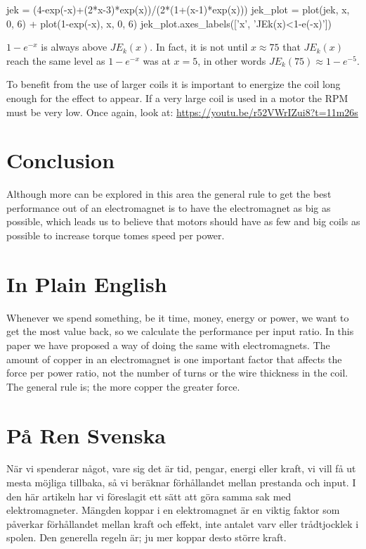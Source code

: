 \documentclass[]{../common/elementary-physics}
\begin{document}
\begin{sagesilent}
jek = (4-exp(-x)+(2*x-3)*exp(x))/(2*(1+(x-1)*exp(x)))
jek_plot = plot(jek, x, 0, 6) + plot(1-exp(-x), x, 0, 6)
jek_plot.axes_labels(['x', 'JEk(x)<1-e(-x)'])
\end{sagesilent}


$1-e^{-x}$ is always above $JE_k(x)$.
In fact, it is not until $x \approx 75$ that $JE_k(x)$ reach the same level as $1-e^{-x}$ was at $x = 5$, in other words $JE_k(75) \approx 1-e^{-5}$.

To benefit from the use of larger coils it is important to energize the coil long enough for the effect to appear.
If a very large coil is used in a motor the RPM must be very low.
Once again, look at: \url{https://youtu.be/r52VWrIZui8?t=11m26s}

\section{Conclusion}

Although more can be explored in this area the general rule to get the best performance out of an electromagnet is to have the electromagnet as big as possible, which leads us to believe that motors should have as few and big coils as possible\cite{jonew} to increase torque tomes speed per power.

\appendix

\section{In Plain English}

Whenever we spend something, be it time, money, energy or power, we want to get the most value back, so we calculate the performance per input ratio.
In this paper we have proposed a way of doing the same with electromagnets.
The amount of copper in an electromagnet is one important factor that affects the force per power ratio, not the number of turns or the wire thickness in the coil.
The general rule is; the more copper the greater force.

\section{På Ren Svenska}

När vi spenderar något, vare sig det är tid, pengar, energi eller kraft, vi vill få ut mesta möjliga tillbaka, så vi beräknar förhållandet mellan prestanda och input.
I den här artikeln har vi föreslagit ett sätt att göra samma sak med elektromagneter.
Mängden koppar i en elektromagnet är en viktig faktor som påverkar förhållandet mellan kraft och effekt, inte antalet varv eller trådtjocklek i spolen.
Den generella regeln är; ju mer koppar desto större kraft.
\end{document}

